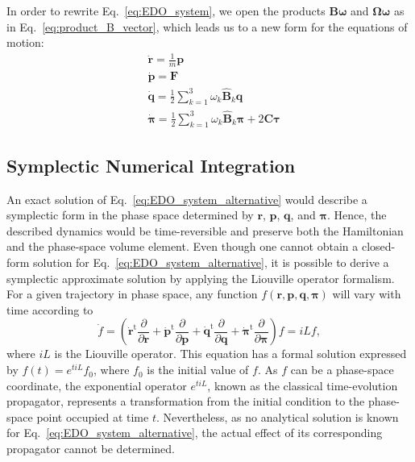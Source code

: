\documentclass[aip,jcp,reprint,amsmath,amssymb]{revtex4-1}
\newcommand{\mt}[1]{\boldsymbol{\mathbf{#1}}}           %
\newcommand{\vt}[1]{\boldsymbol{\mathbf{#1}}}           %
\newcommand{\tr}[1]{#1^\text{t}}                        %
\newcommand{\diff}[2]{\dfrac{\partial #1}{\partial #2}} %
\begin{document}
In order to rewrite Eq.~\ref{eq:EDO_system}, we open the products $\mt B \vt \omega$ and $\mt \Omega \vt \omega$ as in Eq.~\ref{eq:product_B_vector}, which leads us to a new form for the equations of motion:
\begin{subequations}
\label{eq:EDO_system_alternative}
\begin{align}
&\dot{\vt r} = \frac{1}{m} \vt p \\
&\dot{\vt p} = \vt F \\
&\dot{\vt q} = \frac{1}{2} \sum_{k=1}^3 \omega_k \hat{\mt B}_k \vt q \label{eq:edo_q} \\
&\dot{\vt \pi} = \frac{1}{2} \sum_{k=1}^3 \omega_k \hat{\mt B}_k \vt \pi + 2 \mt C \vt \tau \label{eq:edo_pi}
\end{align}
\end{subequations}

\subsection{Symplectic Numerical Integration}  
\label{sec:symplectic}

An exact solution of Eq.~\ref{eq:EDO_system_alternative} would describe a symplectic form in the phase space determined by $\vt r$, $\vt p$, $\vt q$, and $\vt \pi$. Hence, the described dynamics would be time-reversible and preserve both the Hamiltonian and the phase-space volume element. Even though one cannot obtain a closed-form solution for Eq.~\ref{eq:EDO_system_alternative}, it is possible to derive a symplectic approximate solution by applying the Liouville operator formalism.\cite{Tuckerman2010} For a given trajectory in phase space, any function $f(\vt r, \vt p, \vt q, \vt \pi)$ will vary with time according to
\[
\dot{f} = \left( \tr{\dot{\vt r}} \diff{}{\vt r} + \tr{\dot{\vt p}} \diff{}{\vt p} + \tr{\dot{\vt q}} \diff{}{\vt q} + \tr{\dot{\vt \pi}} \diff{}{\vt \pi} \right) f = i\!L f,
\]
where $i\!L$ is the Liouville operator. This equation has a formal solution expressed by $f(t) = e^{t i\!L}f_0$, where $f_0$ is the initial value of $f$. As $f$ can be a phase-space coordinate, the exponential operator $e^{t i\!L}$, known as the classical time-evolution propagator,\cite{Tuckerman2008} represents a transformation from the initial condition to the phase-space point occupied at time $t$. Nevertheless, as no analytical solution is known for Eq.~\ref{eq:EDO_system_alternative}, the actual effect of its corresponding propagator cannot be determined.
\end{document}
